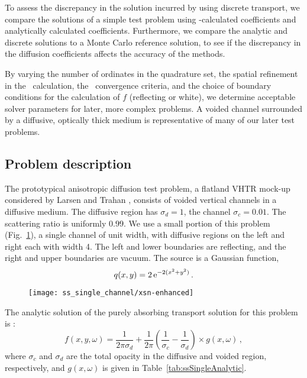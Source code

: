 To assess the discrepancy in the solution incurred by using discrete transport,
we compare the solutions of a simple test problem using \SN-calculated
coefficients and analytically calculated coefficients. Furthermore, we compare
the analytic and discrete solutions to a Monte Carlo reference solution, to see
if the discrepancy in the diffusion coefficients affects the accuracy of
the methods.

By varying the number of ordinates in the quadrature set, the spatial
refinement in the \SN\ calculation, the \SN\ convergence criteria, and the
choice of boundary conditions for the calculation of $f$ (reflecting or white),
we determine acceptable solver parameters for later, more complex
problems.  A
voided channel surrounded by a diffusive, optically thick medium is
representative of many of our later test problems.

\subsection{Problem description}

The prototypical anisotropic diffusion test problem, a flatland VHTR mock-up
considered by Larsen and Trahan \cite{Lar2009c}, consists of voided vertical channels in a
diffusive medium. The diffusive region has $\sigma_d=1$, the channel
$\sigma_c=0.01$. The scattering ratio is uniformly $0.99$.  We use a small
portion of this problem (Fig.~\ref{fig:ssSingleXsn}), a single channel of unit
width, with diffusive regions on the left and right each with width 4. The left
and lower boundaries are reflecting, and the right and upper boundaries are
vacuum. The source is a Gaussian function,
\begin{equation*}
  q(x,y) = 2 \mathop{}\!\mathrm{e}^{-2 (x^2 + y^2)}\,.
\end{equation*}

\begin{figure}[htb]
  \centering
  \texttt{[image: ss\_single\_channel/xsn-enhanced]}
  \label{fig:ssSingleXsn}
\end{figure}

The analytic solution of the purely absorbing transport solution for this
problem is \cite{Lar2009c}:
\begin{equation}\label{eq:ssSingleAnalytic}
  f(x,y,\omega)
  = \frac{1}{2\pi \sigma_d}
  + \frac{1}{2\pi} \left( \frac{1}{\sigma_c} - \frac{1}{\sigma_d} \right)
  \times g(x,\omega)\,,
\end{equation}
where $\sigma_c$ and $\sigma_d$ are the total opacity in the diffusive
and voided region, respectively, and $g(x,\omega)$ is given in
Table~\ref{tab:ssSingleAnalytic}.

